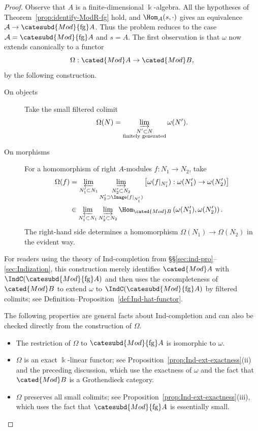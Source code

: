 \begin{proof}
	Observe that $A$ is a finite-dimensional $\Bbbk$-algebra. All the
	hypotheses of Theorem~\ref{prop:identify-ModR-fg} hold, and
	$\Hom_{\mathcal{A}}(s,\mathord\cdot)$ gives an equivalence
	$\mathcal{A}\to\catesubd{Mod}{\mathrm{fg}}A$. Thus the problem reduces
	to the case $\mathcal{A}=\catesubd{Mod}{\mathrm{fg}}A$ and $s=A$.
	The first observation is that $\omega$ now extends canonically to a
	functor
	\[ \Omega: \cated{Mod}A \to \cated{Mod}B, \]
	by the following construction.
	\begin{description}
		\item[On objects] Take the small filtered colimit
		\begin{equation}\label{eqn:Tannaka-tilde-omega}
			\Omega(N) = \varinjlim_{\substack{N' \subset N \\ \text{finitely generated}}} \omega(N').
		\end{equation}
		\item[On morphisms] For a homomorphism of right $A$-modules
		$f:N_1\to N_2$, take
		\begin{align*}
			\Omega(f) & = \varprojlim_{N'_1 \subset N_1} \varinjlim_{\substack{N'_2 \subset N_2 \\ N'_2 \supset \Image(f|_{N'_1}) }} \left[ \omega(f|_{N'_1}): \omega(N'_1) \to \omega(N'_2) \right] \\
			& \in \varprojlim_{N'_1 \subset N_1} \varinjlim_{N'_2 \subset N_2} \Hom_{\cated{Mod}B}\left( \omega(N'_1), \omega(N'_2)\right).
		\end{align*}
		The right-hand side determines a homomorphism
		$\Omega(N_1)\to\Omega(N_2)$ in the evident way.
	\end{description}

	For readers using the theory of Ind-completion from
	\S\S\ref{sec:ind-pro}--\ref{sec:Indization}, this construction merely
	identifies $\cated{Mod}A$ with
	$\IndC(\catesubd{Mod}{\mathrm{fg}}A)$ and then uses the cocompleteness of
	$\cated{Mod}B$ to extend $\omega$ to
	$\IndC(\catesubd{Mod}{\mathrm{fg}}A)$ by filtered colimits; see
	Definition--Proposition~\ref{def:Ind-hat-functor}.

	The following properties are general facts about Ind-completion and can
	also be checked directly from the construction of $\Omega$.
	\begin{itemize}
		\item The restriction of $\Omega$ to
		$\catesubd{Mod}{\mathrm{fg}}A$ is isomorphic to $\omega$.
		\item $\Omega$ is an exact $\Bbbk$-linear functor; see
		Proposition~\ref{prop:Ind-ext-exactness}(ii) and the preceding
		discussion, which use the exactness of $\omega$ and the fact that
		$\cated{Mod}B$ is a Grothendieck category.
		\item $\Omega$ preserves all small colimits; see
		Proposition~\ref{prop:Ind-ext-exactness}(iii), which uses the fact
		that $\catesubd{Mod}{\mathrm{fg}}A$ is essentially small.
	\end{itemize}


\end{proof}
